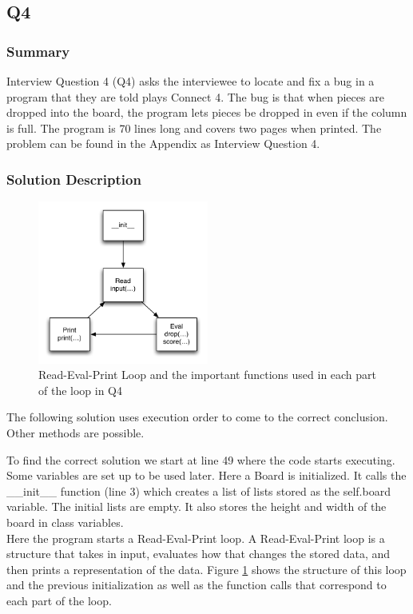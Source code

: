 \subsection{Q4}
\subsubsection{Summary}
Interview Question 4 (Q4) asks the interviewee to locate and fix a bug in a program that they are told plays Connect 4.
The bug is that when pieces are dropped into the board, the program lets pieces be dropped in even if the column is full.
The program is 70 lines long and covers two pages when printed.
The problem can be found in the Appendix as Interview Question 4.

\subsubsection{Solution Description}
\begin{figure}[t]
\centering
\includegraphics[width=0.5\textwidth]{Q4diagram.pdf}
\caption{Read-Eval-Print Loop and the important functions used in each part of the loop in Q4}
\label{fig-q2}
\end{figure}

The following solution uses execution order to come to the correct conclusion. Other methods are possible. 

To find the correct solution we start at line 49 where the code starts executing.
Some variables are set up to be used later. 
Here a Board is initialized.
It calls the \_\_init\_\_ function (line 3) which creates a list of lists stored as the self.board variable.
The initial lists are empty.
It also stores the height and width of the board in class variables. \\

Here the program starts a Read-Eval-Print loop. A Read-Eval-Print loop is a structure that takes in input, evaluates how that changes the stored data, and then prints a representation of the data. Figure \ref{fig-q2} shows the structure of this loop and the previous initialization as well as the function calls that correspond to each part of the loop.\\

